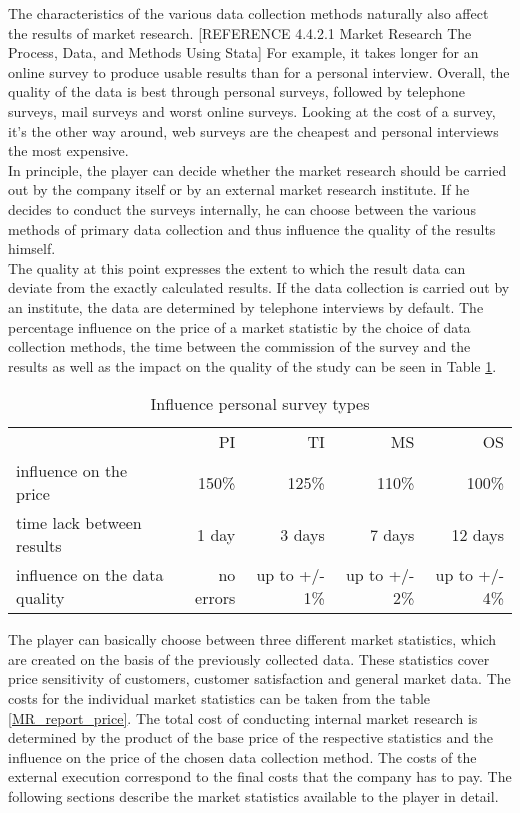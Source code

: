 The characteristics of the various data collection methods naturally also affect the results of market research. [REFERENCE 4.4.2.1 Market Research The Process, Data, and Methods Using Stata] For example, it takes longer for an online survey to produce usable results than for a personal interview. Overall, the quality of the data is best through personal surveys, followed by telephone surveys, mail surveys and worst online surveys. Looking at the cost of a survey, it's the other way around, web surveys are the cheapest and personal interviews the most expensive. \\
In principle, the player can decide whether the market research should be carried out by the company itself or by an external market research institute. If he decides to conduct the surveys internally, he can choose between the various methods of primary data collection and thus influence the quality of the results himself. \\
The quality at this point expresses the extent to which the result data can deviate from the exactly calculated results. If the data collection is carried out by an institute, the data are determined by telephone interviews by default. The percentage influence on the price of a market statistic by the choice of data collection methods, the time between the commission of the survey and the results as well as the impact on the quality of the study can be seen in Table \ref{MR_survey_types_influence}. \\

\begin{table}[ht]
\centering
\begin{tabular}{|l|r|r|r|r|}
\hline
                                 & PI           & TI             & MS             & OS \\
influence on the price           & 150\%        & 125\%          & 110\%          & 100\%   \\
time lack between results        & 1 day        & 3 days         & 7 days         & 12 days   \\
influence on the data quality    & no errors    & up to +/- 1\%  & up to +/- 2\%  & up to +/- 4\%   \\
\hline
\end{tabular}
\caption{Influence personal survey types}
\label{MR_survey_types_influence}
\end{table}

The player can basically choose between three different market statistics, which are created on the basis of the previously collected data. These statistics cover price sensitivity of customers, customer satisfaction and general market data. 
The costs for the individual market statistics can be taken from the table \ref{MR_report_price}. The total cost of conducting internal market research is determined by the product of the base price of the respective statistics and the influence on the price of the chosen data collection method. The costs of the external execution correspond to the final costs that the company has to pay. 
The following sections describe the market statistics available to the player in detail. \\

